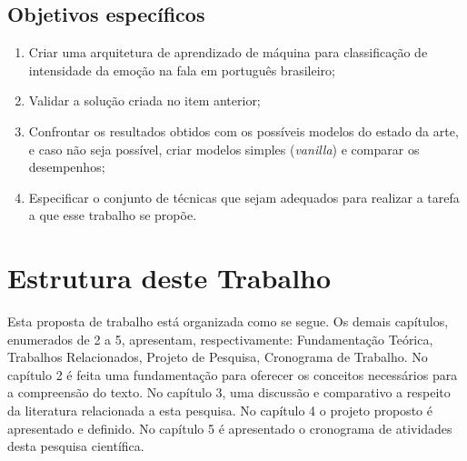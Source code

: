 \subsection{Objetivos específicos}


\begin{enumerate}
    \item Criar uma arquitetura de aprendizado de máquina para classificação de intensidade da emoção na fala em português brasileiro;
    \item Validar a solução criada no item anterior;
    \item Confrontar os resultados obtidos com os possíveis modelos do estado da arte, e caso não seja possível, criar modelos simples (\textit{vanilla}) e comparar os desempenhos;
    \item Especificar o conjunto de técnicas que sejam adequados para realizar a tarefa a que esse trabalho se propõe.
\end{enumerate}

\section{Estrutura deste Trabalho}

Esta proposta de trabalho está organizada como se segue. Os demais capítulos, enumerados de 2 a 5, apresentam, respectivamente: Fundamentação Teórica, Trabalhos Relacionados, Projeto de Pesquisa, Cronograma de Trabalho. No capítulo 2 é feita uma fundamentação para oferecer os conceitos necessários para a compreensão do texto. No capítulo 3, uma discussão e comparativo a respeito da literatura relacionada a esta pesquisa. No capítulo 4 o projeto proposto é apresentado e definido. No capítulo 5 é apresentado o cronograma de atividades desta pesquisa científica.
